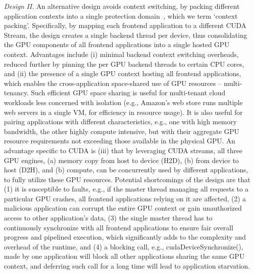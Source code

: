 \textit{Design II.} An alternative design avoids context switching, by packing different application contexts into a single protection domain~\cite{liedtke}, which we term ‘context packing’. Specifically, by mapping each frontend application to a different CUDA Stream, the design creates a single backend thread per device, thus consolidating the GPU components of all frontend applications into a single hosted GPU context. Advantages include (i) minimal backend context switching overheads, reduced further by pinning the per GPU backend threads to certain CPU cores, and (ii) the presence of a single GPU context hosting all frontend applications, which enables the cross-application space-shared use of GPU resources – multi-tenancy. Such efficient GPU space sharing is useful for multi-tenant cloud workloads less concerned with isolation (e.g., Amazon’s web store runs multiple web servers in a single VM, for efficiency in resource usage). It is also useful for pairing applications with different characteristics, e.g., one with high memory bandwidth, the other highly compute intensive, but with their aggregate GPU resource requirements not exceeding those available in the physical GPU. An advantage specific to CUDA is (iii) that by leveraging CUDA streams, all three GPU engines, (a) memory copy from host to device (H2D), (b) from device to host (D2H), and (b) compute, can be concurrently used by different applications, to fully utilize these GPU resources. Potential shortcomings of the design are that (1) it is susceptible to faults, e.g., if the master thread managing all requests to a particular GPU crashes, all frontend applications relying on it are affected, (2) a malicious application can corrupt the entire GPU context or gain unauthorized access to other application’s data, (3) the single master thread has to continuously synchronize with all frontend applications to ensure fair overall progress and pipelined execution, which significantly adds to the complexity and overhead of the runtime, and (4) a blocking call, e.g., cudaDeviceSynchronize(), made by one application will block all other applications sharing the same GPU context, and deferring such call for a long time will lead to application starvation.

